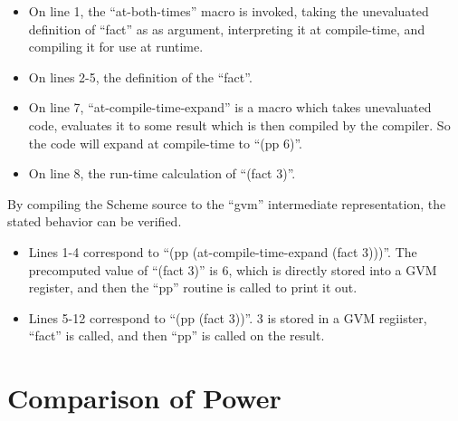  \begin{itemize}
   \item
      On line 1, the ``at-both-times'' macro is invoked, taking the unevaluated
      definition of ``fact'' as
      as argument, interpreting it at compile-time, and compiling it for use at runtime.
   \item
      On lines 2-5, the definition of the ``fact''.
   \item
      On line 7, ``at-compile-time-expand'' is a macro which takes unevaluated code,
      evaluates it to some result which is then compiled by the compiler.  So the code
      will expand at compile-time to ``(pp 6)''.
   \item
      On line 8, the run-time calculation of ``(fact 3)''.
 \end{itemize}

 By compiling the Scheme source to the ``gvm'' intermediate
 representation, the stated behavior can be verified.


 \begin{itemize}
   \item
      Lines 1-4 correspond to ``(pp (at-compile-time-expand (fact 3)))''.  The precomputed
      value of ``(fact 3)'' is 6, which is directly stored into a GVM register, and
      then the ``pp'' routine is called to print it out.
   \item
      Lines 5-12 correspond to ``(pp (fact 3))''.  3 is stored in a GVM regiister, ``fact''
      is called, and then ``pp'' is called on the result.
 \end{itemize}

 \section{Comparison of Power}


